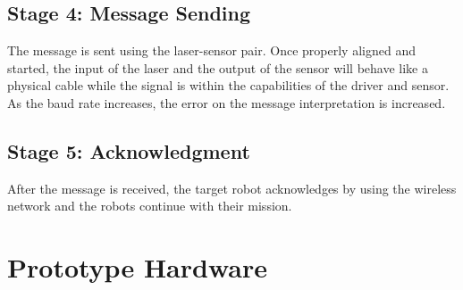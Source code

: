 \documentclass[botnum, fleqn]{unmeethesis}
\begin{document}
\subsection*{Stage 4: Message Sending}

The message is sent using the laser-sensor pair. Once properly aligned and started, the input of the laser and the output of the sensor will behave like a physical cable while the signal is within the capabilities of the driver and sensor. As the baud rate increases, the error on the message interpretation is increased.

\subsection*{Stage 5: Acknowledgment}

After the message is received, the target robot acknowledges by using the wireless network and the robots continue with their mission.

\section*{Prototype Hardware}\label{chp:}

\end{document}
